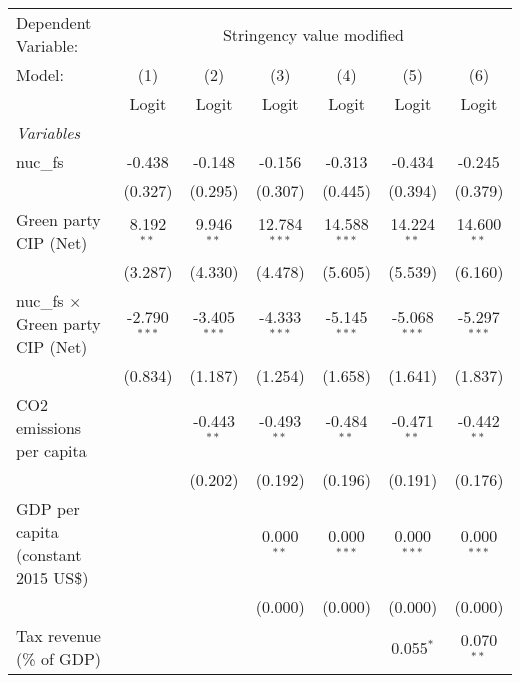 
\begingroup
\centering
\begin{tabular}{lcccccc}
   \toprule
   Dependent Variable: & \multicolumn{6}{c}{Stringency value modified}\\
   Model:                                   & (1)            & (2)            & (3)            & (4)            & (5)            & (6)\\  
                                            &  Logit         & Logit          & Logit          & Logit          & Logit          & Logit\\  
   \midrule
   \emph{Variables}\\
   nuc\_fs                                  & -0.438         & -0.148         & -0.156         & -0.313         & -0.434         & -0.245\\   
                                            & (0.327)        & (0.295)        & (0.307)        & (0.445)        & (0.394)        & (0.379)\\   
   Green party CIP (Net)                    & 8.192$^{**}$   & 9.946$^{**}$   & 12.784$^{***}$ & 14.588$^{***}$ & 14.224$^{**}$  & 14.600$^{**}$\\   
                                            & (3.287)        & (4.330)        & (4.478)        & (5.605)        & (5.539)        & (6.160)\\   
   nuc\_fs $\times$ Green party CIP (Net)   & -2.790$^{***}$ & -3.405$^{***}$ & -4.333$^{***}$ & -5.145$^{***}$ & -5.068$^{***}$ & -5.297$^{***}$\\   
                                            & (0.834)        & (1.187)        & (1.254)        & (1.658)        & (1.641)        & (1.837)\\   
   CO2 emissions per capita                 &                & -0.443$^{**}$  & -0.493$^{**}$  & -0.484$^{**}$  & -0.471$^{**}$  & -0.442$^{**}$\\   
                                            &                & (0.202)        & (0.192)        & (0.196)        & (0.191)        & (0.176)\\   
   GDP per capita (constant 2015 US\$)      &                &                & 0.000$^{**}$   & 0.000$^{***}$  & 0.000$^{***}$  & 0.000$^{***}$\\   
                                            &                &                & (0.000)        & (0.000)        & (0.000)        & (0.000)\\   
   Tax revenue (\% of GDP)                  &                &                &                &                & 0.055$^{*}$    & 0.070$^{**}$\\   

\end{tabular}
